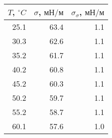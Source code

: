 \begin{tabular}{rrr}
\toprule
$T$, $^\circ C$ & $\sigma$, $мН/м$ & $\sigma_{\sigma}$, $мН/м$ \\
\midrule
25.1 & 63.4 & 1.1 \\
30.3 & 62.6 & 1.1 \\
35.2 & 61.7 & 1.1 \\
40.2 & 60.8 & 1.1 \\
45.2 & 60.3 & 1.1 \\
50.2 & 59.7 & 1.1 \\
55.2 & 58.7 & 1.1 \\
60.1 & 57.6 & 1.0 \\
\bottomrule
\end{tabular}
